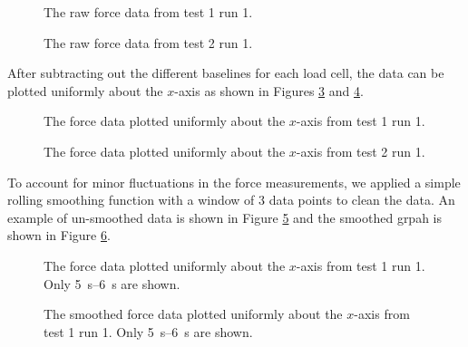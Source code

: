 \documentclass[12 pt]{report}
\begin{document}
\begin{figure}[htbp]
	\centering
	
	\caption{The raw force data from test \num{1} run \num{1}.}
	\label{fig:test1_run1}
\end{figure}

\begin{figure}[htbp]
	\centering
	
	\caption{The raw force data from test \num{2} run \num{1}.}
	\label{fig:test2_run1}
\end{figure}

After subtracting out the different baselines for each load cell, the data can be plotted uniformly about the $x$-axis as shown in Figures \ref{fig:test1_run1_baseline_removed} and \ref{fig:test2_run1_baseline_removed}.

\begin{figure}[htbp]
	\centering
	
	\caption{The force data plotted uniformly about the $x$-axis from test \num{1} run \num{1}.}
	\label{fig:test1_run1_baseline_removed}
\end{figure}

\begin{figure}[htbp]
	\centering
	
	\caption{The force data plotted uniformly about the $x$-axis from test \num{2} run \num{1}.}
	\label{fig:test2_run1_baseline_removed}
\end{figure}

To account for minor fluctuations in the force measurements, we applied a simple rolling smoothing function with a window of \num{3} data points to clean the data. An example of un-smoothed data is shown in Figure \ref{fig:test1_run1_baseline_removed_5_to_6} and the smoothed grpah is shown in Figure \ref{fig:test1_run1_baseline_removed_smoothed_5_to_6}.

\begin{figure}[htbp]
	\centering
	
	\caption{The force data plotted uniformly about the $x$-axis from test \num{1} run \num{1}. Only \qtyrange{5}{6}{\second} are shown.}
	\label{fig:test1_run1_baseline_removed_5_to_6}
\end{figure}

\begin{figure}[htbp]
	\centering
	
	\caption{The smoothed force data plotted uniformly about the $x$-axis from test \num{1} run \num{1}. Only \qtyrange{5}{6}{\second} are shown.}
	\label{fig:test1_run1_baseline_removed_smoothed_5_to_6}
\end{figure}
\end{document}
